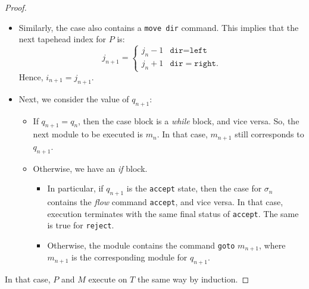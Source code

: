 \begin{appendices}
\begin{proof}
\begin{itemize}
\begin{itemize}
            \item Similarly, the case also contains a \texttt{move dir} command. This implies that the next tapehead index for $P$ is:
            \[j_{n+1} = \begin{cases}
                j_n - 1 & \texttt{dir} = \texttt{left} \\
                j_n + 1 & \texttt{dir} = \texttt{right}.
            \end{cases}\]
            Hence, $i_{n+1} = j_{n+1}$. 
        
            \item Next, we consider the value of $q_{n+1}$:
            \begin{itemize}
                \item If $q_{n+1} = q_n$, then the case block is a \textit{while} block, and vice versa. So, the next module to be executed is $m_n$. In that case, $m_{n+1}$ still corresponds to $q_{n+1}$.
                \item Otherwise, we have an \textit{if} block. 
                \begin{itemize}
                    \item In particular, if $q_{n+1}$ is the \texttt{accept} state, then the case for $\sigma_n$ contains the \textit{flow} command \texttt{accept}, and vice versa. In that case, execution terminates with the same final status of \texttt{accept}. The same is true for \texttt{reject}. 
                    \item Otherwise, the module contains the command \texttt{goto} $m_{n+1}$, where $m_{n+1}$ is the corresponding module for $q_{n+1}$.
                \end{itemize}
            \end{itemize}
        \end{itemize}
    \end{itemize}
    In that case, $P$ and $M$ execute on $T$ the same way by induction.
\end{proof}


\end{appendices}
